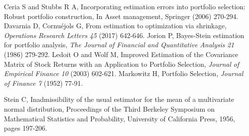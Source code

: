 \documentclass{article}
\begin{document}
\begin{thebibliography}{1}
  Ceria S and  Stubbs R A, Incorporating estimation errors into portfolio selection: Robust
portfolio construction, In Asset management, Springer   (2006) 270-294.
     Davarnia D, Cornuéjols G, From estimation to optimization via shrinkage, {\it Operations Research Letters 45} (2017) 642-646.
     Jorion P,  Bayes-Stein estimation for portfolio analysis, {\it The Journal of Financial and Quantitative
Analysis 21}  (1986)  279-292.
  Ledoit O and Wolf M,
Improved Estimation of the Covariance Matrix of Stock Returns with an Application to Portfolio Selection,
{\it Journal of Empirical Finance 10} (2003) 602-621.
   Markowitz H, Portfolio Selection, {\it Journal of Finance 7} (1952) 77-91.

            Stein C, Inadmissibility of the usual estimator for the mean of a multivariate normal distribution,
Proceedings of the Third Berkeley Symposium on Mathematical Statistics and Probability, University of California Press, 1956, pages 197-206.
\end{thebibliography}
\end{document}
